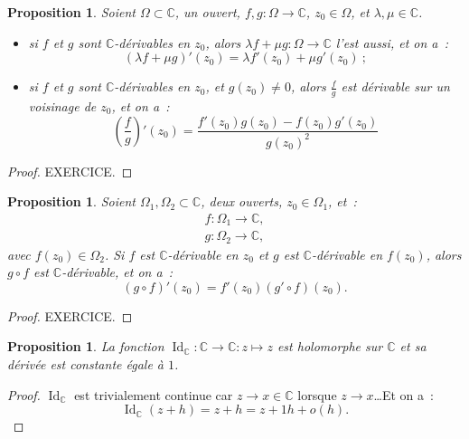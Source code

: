 \documentclass{report}
\newtheorem{prp}[thm]{Proposition}
\theoremstyle{definition}
\theoremstyle{remark}
\numberwithin{equation}{section}
\newcommand{\C}{\mathbb C}
\DeclareMathOperator{\Id}{Id}
\begin{document}
			\begin{prp} Soient $\Omega \subset \C$, un ouvert, $f, g : \Omega \to \C$, $z_0 \in \Omega$, et $\lambda, \mu \in \C$.
			\begin{itemize}
				\item si $f$ et $g$ sont $\C$-dérivables en $z_0$, alors $\lambda f + \mu g : \Omega \to \C$ l'est aussi, et on a~:
				\begin{equation}
					(\lambda f + \mu g)'(z_0) = \lambda f'(z_0) + \mu g'(z_0)~;
				\end{equation}
				\item si $f$ et $g$ sont $\C$-dérivables en $z_0$, et $g(z_0) \neq 0$, alors $\frac fg$ est dérivable sur un voisinage de $z_0$, et on a~:
				\begin{equation}
					\left(\frac fg\right)'(z_0) = \frac {f'(z_0)g(z_0) - f(z_0)g'(z_0)}{g(z_0)^2}
				\end{equation}
			\end{itemize}
			\end{prp}

			\begin{proof} EXERCICE.
			\end{proof}

			\begin{prp} Soient $\Omega_1, \Omega_2 \subset \C$, deux ouverts, $z_0 \in \Omega_1$, et~:
			\begin{align}
				f : \Omega_1 \to \C, \\
				g : \Omega_2 \to \C,
			\end{align}
			avec $f(z_0) \in \Omega_2$. Si $f$ est $\C$-dérivable en $z_0$ et $g$ est $\C$-dérivable en $f(z_0)$, alors $g \circ f$ est $\C$-dérivable, et on a~:
			\begin{equation}
				(g \circ f)'(z_0) = f'(z_0)(g' \circ f)(z_0).
			\end{equation}
			\end{prp}

			\begin{proof} EXERCICE.
			\end{proof}

			\begin{prp} La fonction $\Id_\C : \C \to \C : z \mapsto z$ est holomorphe sur $\C$ et sa dérivée est constante égale à $1$.
			\end{prp}

			\begin{proof} $\Id_\C$ est trivialement continue car $z \to x \in \C$ lorsque $z \to x$\ldots Et on a~:
			\begin{equation}
				\Id_\C(z+h) = z + h = z + 1h + o(h).
			\end{equation}
			\end{proof}
\end{document}
